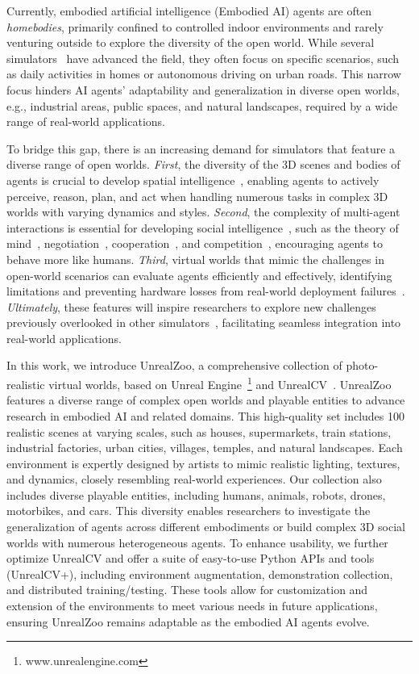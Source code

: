 \documentclass{article}
\begin{document}
Currently, embodied artificial intelligence (Embodied AI) agents are often \textit{homebodies}, primarily confined to controlled indoor environments and rarely venturing outside to explore the diversity of the open world.  
While several simulators~\citep{kolve2017ai2, CARLA, puig2018virtualhome, li2023behavior,   puig2023habitat} have advanced the field, they often focus on specific scenarios, such as daily activities in homes or autonomous driving on urban roads.
This narrow focus hinders AI agents' adaptability and generalization in diverse open worlds, e.g., industrial areas, public spaces, and natural landscapes, required by a wide range of real-world applications.

To bridge this gap, there is an increasing demand for simulators that feature a diverse range of open worlds. 
\emph{First}, the diversity of the 3D scenes and bodies of agents is crucial to develop spatial intelligence~\citep{davison2018futuremapping}, enabling agents to actively perceive, reason, plan, and act when handling numerous tasks in complex 3D worlds with varying dynamics and styles.
\emph{Second}, the complexity of multi-agent interactions is essential for developing social intelligence~\citep{duenez2023social}, such as the theory of mind~\citep{jin-etal-2024-mmtom}, negotiation~\citep{guan2024richelieu}, cooperation~\citep{wang2022tomc}, and competition~\citep{zhong2021distractor}, encouraging agents to behave more like humans.
\emph{Third}, virtual worlds that mimic the challenges in open-world scenarios can evaluate agents efficiently and effectively, identifying limitations and preventing hardware losses from real-world deployment failures~\citep{kadian2020sim2real}.
\emph{Ultimately}, these features will inspire researchers to explore new challenges previously overlooked in other simulators~\citep{duan2022survey}, facilitating seamless integration into real-world applications.


In this work, we introduce UnrealZoo, a comprehensive collection of photo-realistic virtual worlds, based on Unreal Engine~\footnote{www.unrealengine.com} and UnrealCV~\citep{qiu2017unrealcv}. UnrealZoo features a diverse range of complex open worlds and playable entities to advance research in embodied AI and related domains. 
This high-quality set includes 100 realistic scenes at varying scales, such as houses, supermarkets, train stations, industrial factories, urban cities, villages, temples, and natural landscapes.
Each environment is expertly designed by artists to mimic realistic lighting, textures, and dynamics, closely resembling real-world experiences.
Our collection also includes diverse playable entities, including humans, animals, robots, drones, motorbikes, and cars. This diversity enables researchers to investigate the generalization of agents across different embodiments or build complex 3D social worlds with numerous heterogeneous agents.
To enhance usability, we further optimize UnrealCV and offer a suite of easy-to-use Python APIs and tools (UnrealCV+), including environment augmentation, demonstration collection, and distributed training/testing. These tools allow for customization and extension of the environments to meet various needs in future applications, ensuring UnrealZoo remains adaptable as the embodied AI agents evolve.
\end{document}
